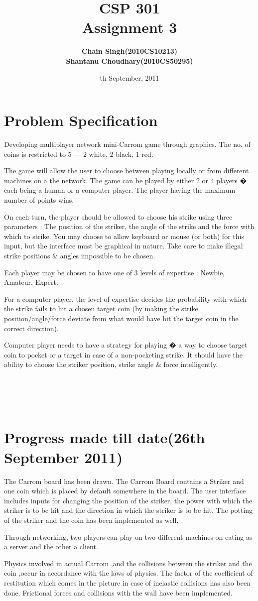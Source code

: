 \documentclass{article}
\title{CSP 301\\ Assignment 3}
\author{\bf Chain Singh(2010CS10213)\\\bf Shantanu Choudhary(2010CS50295)}
\date{th September, 2011}
\begin{document}
\maketitle
\section*{Problem Specification}
\label{sec:Problems}
\item Developing multiplayer network mini-Carrom game through graphics. The no. of coins is restricted to 5 --- 2 white, 2 black, 1 red.
\item The game will allow the user to choose between playing locally or from different machines on a the network. The game can be played by either 2 or 4 players � each being a human or a computer player. The player having the maximum number of points wins.
\item On each turn, the player should be allowed to choose his strike using three parameters : The position of the striker, the angle of the strike and the force with which to strike. You may choose to allow keyboard or mouse (or both) for this input, but the interface must be graphical in nature. Take care to make illegal strike positions & angles impossible to be chosen.
\item Each player may be chosen to have one of 3 levels of expertise : Newbie, Amateur, Expert.
\item For a computer player, the level of expertise decides the probability with which the strike fails to hit a chosen target coin (by making the strike position/angle/force deviate from what would have hit the target coin in the correct direction).
\item Computer player needs to have a strategy for playing � a way to choose target coin to pocket or a target in case of a non-pocketing strike. It should have the ability to choose the striker position, strike angle & force intelligently.
\section*{\\\\Progress made  till date(26th September 2011)}
\item The Carrom board has been drawn. The Carrom Board contains a Striker and one coin which is placed by default somewhere in the board. The user interface includes inputs for changing the position of the striker, the power with which the striker is to be hit and the direction in which the striker is to be hit. The potting of the striker and the coin has been implemented as well.
\item Through networking, two players can play on two different machines on eating as a server and the other a client.
\item Physics involved in actual Carrom ,and the collisions between the striker and the coin ,occur in accordance with the laws of physics. The factor of the coefficient of restitution which comes in the picture in case of inelastic collisions has also been done. Frictional forces and collisions with the wall have been implemented.
\end{document}
